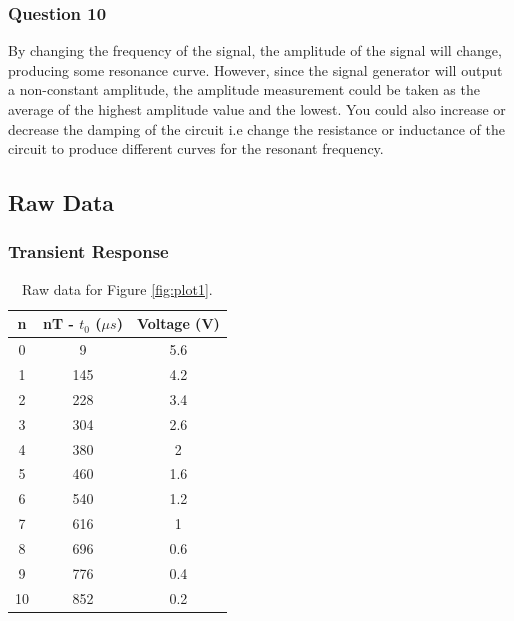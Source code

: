 \documentclass{article}
\begin{document}
\subsubsection{Question 10}
By changing the frequency of the signal, the amplitude of the signal will change, producing 
some resonance curve. However, since the signal generator will output a non-constant amplitude,
the amplitude measurement could be taken as the average of the highest amplitude value and the 
lowest. You could also increase or decrease the damping of the circuit i.e change the resistance 
or inductance of the circuit to produce different curves for the resonant frequency.

\subsection{Raw Data}
\subsubsection{Transient Response}
\begin{table}[H]
    \centering
    \begin{tabular}{c|c|c}
    n & nT - $t_0$ ($\mu s$) & Voltage (V) \\
    \hline
    0	&9&	5.6 \\
    1	&145&	4.2 \\
    2	&228&	3.4 \\
    3	&304&	2.6 \\
    4	&380&	2 \\
    5	&460&	1.6 \\
    6	&540&	1.2 \\
    7	&616&	1 \\
    8	&696&	0.6 \\
    9	&776&	0.4 \\
    10	&852&	0.2
    \end{tabular}
    \caption{Raw data for Figure \ref{fig:plot1}.}
    \label{fig:t1}
\end{table}
\end{document}
